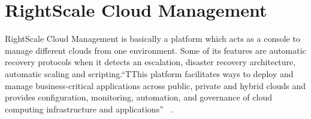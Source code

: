 \section{RightScale Cloud Management}

RightScale Cloud Management is basically a platform which acts as a console to
manage different clouds from one environment. Some of its features are
automatic recovery protocols when it detects an escalation, disaster recovery 
architecture, automatic scaling and scripting.``TThis platform facilitates ways 
to deploy and manage business-critical applications across public, 
private and hybrid clouds and provides configuration, monitoring, automation, 
and governance of cloud computing infrastructure and
applications'' ~\cite{hid-sp18-418-RightScale-Cloud-Management-article}.

